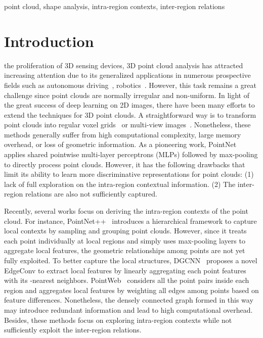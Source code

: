 \documentclass[journal]{IEEEtran}
\begin{document}
\begin{IEEEkeywords}
point cloud, shape analysis, intra-region contexts, inter-region relations
\end{IEEEkeywords}

\IEEEpeerreviewmaketitle

\section{Introduction}\label{sec:introduction}

 the proliferation of 3D sensing devices, 3D point cloud analysis has attracted increasing attention due to its generalized applications in numerous prospective fields such as autonomous driving~\cite{wang2019pseudo}, robotics~\cite{ahmed2018edge}. However, this task remains a great challenge since point clouds are normally irregular and non-uniform. In light of the great success of deep learning on 2D images, there have been many efforts to extend the techniques
for 3D point clouds. A straightforward way is to transform point clouds into regular voxel grids~\cite{qi2016volumetric,gadelha2018multiresolution,meng2019vv} or multi-view images~\cite{su2015multi,tatarchenko2018tangent,han20193d2seqviews}. Nonetheless, these methods generally suffer from high computational complexity, large memory overhead, or loss of geometric information. 
As a pioneering work, PointNet~\cite{qi2017pointnet} applies shared pointwise multi-layer perceptrons (MLPs) followed by max-pooling to directly process point clouds. However, it has the following drawbacks that limit its ability to learn more discriminative representations for point clouds: (1) lack of full exploration on the intra-region contextual information. (2) The inter-region relations are also not sufficiently captured. 


Recently, several works focus on deriving the intra-region contexts of the point cloud. For instance, PointNet++~\cite{qi2017pointnet++} introduces a hierarchical framework to capture local contexts by sampling and grouping point clouds. However, since it treats each point individually at local regions and simply uses max-pooling layers to aggregate local features, the geometric relationships among points are not yet fully exploited. To better capture the local structures, DGCNN~\cite{wang2019dynamic} proposes a novel EdgeConv to extract local features by linearly aggregating each point features with its -nearest neighbors. PointWeb~\cite{zhao2019pointweb} considers all the point pairs inside each region and aggregates local features by weighting all edges among points based on feature differences. Nonetheless, the densely connected graph formed in this way may introduce redundant information and lead to high computational overhead. Besides, these methods focus on exploring intra-region contexts while not sufficiently exploit the inter-region relations. 
\end{document}

